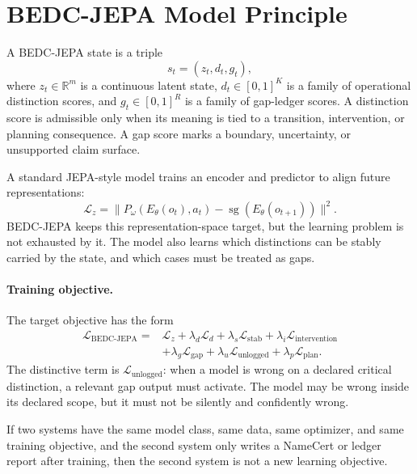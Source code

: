 \section{BEDC-JEPA Model Principle}
\label{sec:model-principle}

\begin{definition}
A BEDC-JEPA state is a triple
$$
  s_t = (z_t,d_t,g_t),
$$
where $z_t \in \mathbb R^m$ is a continuous latent state, $d_t \in [0,1]^K$
is a family of operational distinction scores, and $g_t \in [0,1]^R$ is a
family of gap-ledger scores.  A distinction score is admissible only when its
meaning is tied to a transition, intervention, or planning consequence.  A
gap score marks a boundary, uncertainty, or unsupported claim surface.
\end{definition}

A standard JEPA-style model trains an encoder and predictor to align future
representations:
$$
  \mathcal L_z =
  \lVert P_\omega(E_\theta(o_t),a_t)-\operatorname{sg}(E_\theta(o_{t+1}))\rVert^2.
$$
BEDC-JEPA keeps this representation-space target, but the learning problem is
not exhausted by it.  The model also learns which distinctions can be stably
carried by the state, and which cases must be treated as gaps.

\paragraph{Training objective.}
The target objective has the form
$$
\begin{aligned}
\mathcal L_{\mathrm{BEDC\mbox{-}JEPA}}
={}&\mathcal L_z
+\lambda_d\mathcal L_d
+\lambda_s\mathcal L_{\mathrm{stab}}
+\lambda_i\mathcal L_{\mathrm{intervention}}\\
&+\lambda_g\mathcal L_{\mathrm{gap}}
+\lambda_u\mathcal L_{\mathrm{unlogged}}
+\lambda_p\mathcal L_{\mathrm{plan}} .
\end{aligned}
$$
The distinctive term is $\mathcal L_{\mathrm{unlogged}}$: when a model is
wrong on a declared critical distinction, a relevant gap output must activate.
The model may be wrong inside its declared scope, but it must not be silently
and confidently wrong.

\begin{proposition}
If two systems have the same model class, same data, same optimizer, and same
training objective, and the second system only writes a NameCert or ledger
report after training, then the second system is not a new learning objective.
\end{proposition}

